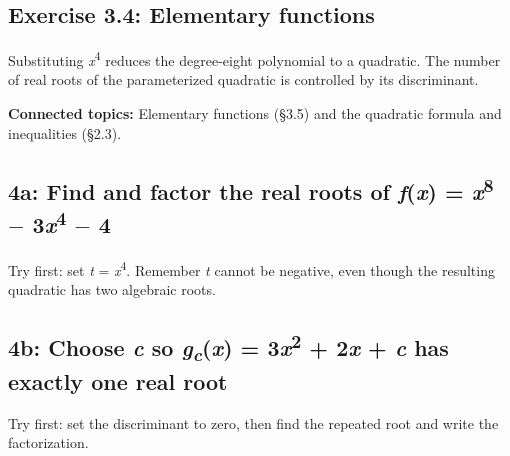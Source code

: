 \documentclass[11pt]{article}
\begin{document}
\begin{keepsection}
\section{Exercise 3.4: Elementary functions}

Substituting \textit{x}\textsuperscript{4} reduces the degree-eight polynomial to a quadratic. The number of real roots of the parameterized quadratic is controlled by its discriminant.

\textbf{Connected topics:} Elementary functions (§3.5) and the quadratic formula and inequalities (§2.3).

\begin{keepsection}
\subsection{4a: Find and factor the real roots of \textit{f}(\textit{x}) = \textit{x}\textsuperscript{8} \ensuremath{-} 3\textit{x}\textsuperscript{4} \ensuremath{-} 4}

Try first: set \textit{t} = \textit{x}\textsuperscript{4}. Remember \textit{t} cannot be negative, even though the resulting quadratic has two algebraic roots.

\end{keepsection}

\begin{keepsection}
\subsection{4b: Choose \textit{c} so \textit{g}\textsubscript{\textit{c}}(\textit{x}) = 3\textit{x}\textsuperscript{2} + 2\textit{x} + \textit{c} has exactly one real root}

Try first: set the discriminant to zero, then find the repeated root and write the factorization.

\end{keepsection}
\end{keepsection}
\end{document}
